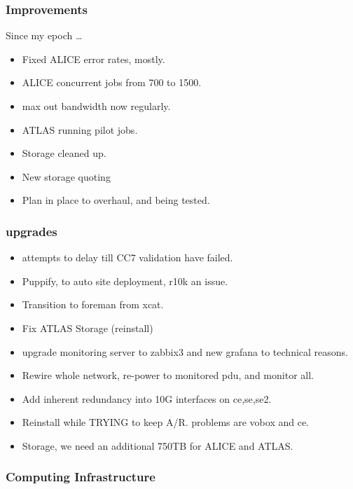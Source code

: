 \documentclass{beamer}
\begin{document}
\begin{frame}
  \frametitle{Improvements}
  Since my epoch \ldots
  \begin{itemize}
    \item Fixed ALICE error rates, mostly.
    \item ALICE concurrent jobs from 700 to 1500.
    \item max out bandwidth now regularly.
    \item ATLAS running pilot jobs. 
    \item Storage cleaned up.
    \item New storage quoting
    \item Plan in place to overhaul, and being tested.
  \end{itemize}

\end{frame}
\begin{frame}
  \frametitle{upgrades}
  \begin{itemize}
    \item attempts to delay till CC7 validation have failed.
    \item Puppify, to auto site deployment, r10k an issue.
    \item Transition to foreman from xcat.
    \item Fix ATLAS Storage (reinstall)
    \item upgrade monitoring server to zabbix3 and new grafana to technical reasons.
    \item Rewire whole network, re-power to monitored pdu, and monitor all.
    \item Add inherent redundancy into 10G interfaces on ce,se,se2.
    \item Reinstall while TRYING to keep A/R. problems are vobox and ce. 
    \item Storage, we need an additional 750TB for ALICE and ATLAS.
  \end{itemize}
\end{frame}
\begin{frame}
  \frametitle{Computing Infrastructure}
\end{frame}
\end{document}
